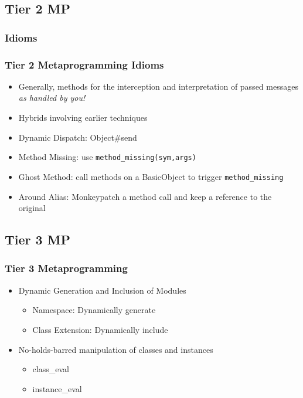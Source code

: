 \documentclass[slidestop,compress,mathserif]{beamer}
\begin{document}
\subsection{Tier 2 MP} %
\label{sub:tier_2_metaprogramming_idioms}

\subsubsection{Idioms} %
\label{ssub:idioms}

\begin{frame}
	\frametitle{Tier 2 Metaprogramming Idioms}
	\begin{itemize}
		\item Generally, methods for the interception and interpretation of passed messages \emph{as handled by you!}
		\item Hybrids involving earlier techniques
	\end{itemize}
	\pause
	\begin{itemize}
		\item Dynamic Dispatch:  Object\#send
		\pause
		\item Method Missing:  use \texttt{method\_missing(sym,\*args)} 
		\pause
		\item Ghost Method:  call methods on a BasicObject to trigger \texttt{method\_missing}
		\pause
		\item Around Alias:  Monkeypatch a method call and keep a reference to the original
	\end{itemize}
\end{frame}

\subsection{Tier 3 MP} %
\label{sub:tier_3_metaprogramming}

\begin{frame}
	\frametitle{Tier 3 Metaprogramming}
	\begin{itemize}
		\item Dynamic Generation and Inclusion of Modules
		\begin{itemize}
			\item Namespace:  Dynamically generate 
			\item Class Extension:  Dynamically include
		\end{itemize}
		\item No-holds-barred manipulation of classes and instances
		\begin{itemize}
			\item class\_eval 
			\item instance\_eval 
		\end{itemize}
	\end{itemize}
\end{frame}
\end{document}
